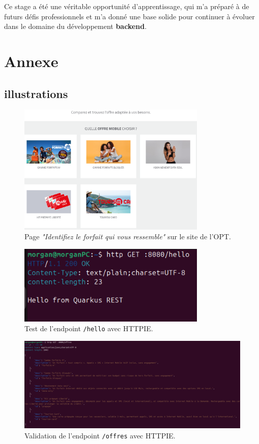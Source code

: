 \documentclass[11pt]{article}
\begin{document}
	\vspace{0.2cm}
	
	Ce stage a été une véritable opportunité d’apprentissage, qui m’a préparé à de futurs défis professionnels et m’a donné une base solide pour continuer à évoluer dans le domaine du développement \textbf{backend}.


		
		\newpage
		\section{Annexe}
		\subsection{illustrations}
			\begin{figure}[H]
			\centering
			\includegraphics[width=0.8\textwidth]{asset/page_forfait.png}
			\caption{Page \textit{"Identifiez le forfait qui vous ressemble"} sur le site de l’OPT.}
			\label{fig:page_forfait}
		\end{figure}
		\begin{figure}[H]
			\centering
			\includegraphics[width=0.8\textwidth]{asset/hello.png}
			\caption{Test de l'endpoint \texttt{/hello} avec HTTPIE.}
			\label{fig:hello_endpoint}
		\end{figure}
		\begin{figure}[H]
			\centering
			\includegraphics[width=1\textwidth]{asset/endpoint offres.png}
			\caption{Validation de l'endpoint \texttt{/offres} avec HTTPIE.}
			\label{fig:offres_endpoint}
		\end{figure}
\end{document}
